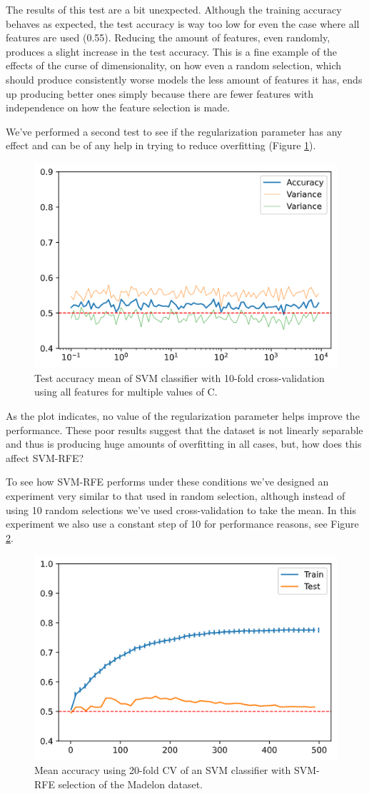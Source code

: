 The results of this test are a bit unexpected. Although the training accuracy behaves as expected, the test accuracy is way too low for even the case where all features are used (0.55). Reducing the amount of features, even randomly, produces a slight increase in the test accuracy. This is a fine example of the effects of the curse of dimensionality, on how even a random selection, which should produce consistently worse models the less amount of features it has, ends up producing better ones simply because there are fewer features with independence on how the feature selection is made.

We've performed a second test to see if the regularization parameter has any effect and can be of any help in trying to reduce overfitting (Figure \ref{fig:dynamicStep.madelon.reg}).

\begin{figure}[h]
    \centering
    \includegraphics[width=0.4\linewidth]{img/madelon-cv-c}
    \caption{Test accuracy mean of SVM classifier with 10-fold cross-validation using all features for multiple values of C.}
    \label{fig:dynamicStep.madelon.reg}
\end{figure}

As the plot indicates, no value of the regularization parameter helps improve the performance. These poor results suggest that the dataset is not linearly separable and thus is producing huge amounts of overfitting in all cases, but, how does this affect SVM-RFE?

To see how SVM-RFE performs under these conditions we've designed an ex\-periment very similar to that used in random selection, although instead of using 10 random selections we've used cross-validation to take the mean. In this experiment we also use a constant step of 10 for performance reasons, see Figure \ref{fig:dynamicStep.madelon.step10}.

\begin{figure}[h]
    \centering
    \includegraphics[width=0.4\linewidth]{img/madelon-svmrfe-step-s_10}
    \caption{Mean accuracy using 20-fold CV of an SVM classifier with SVM-RFE selection of the Madelon dataset.}
    \label{fig:dynamicStep.madelon.step10}
\end{figure}

